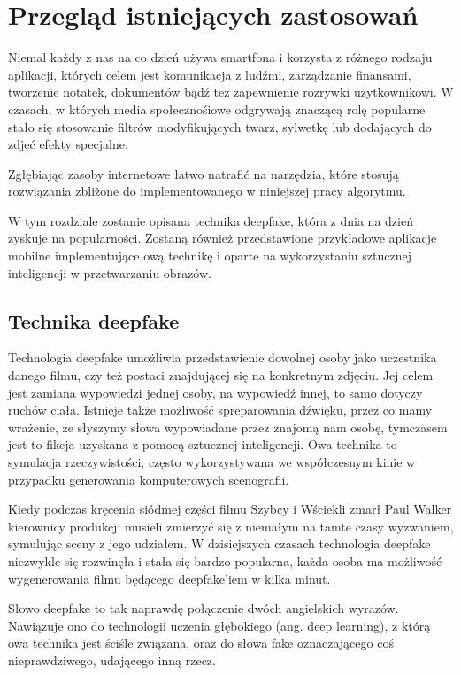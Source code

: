 \chapter{Przegląd istniejących zastosowań}

Niemal każdy z nas na co dzień używa smartfona i korzysta z różnego rodzaju aplikacji, których celem jest komunikacja z ludźmi, zarządzanie finansami, tworzenie notatek, dokumentów bądź też zapewnienie rozrywki użytkownikowi. W czasach, w których media społecznośiowe odgrywają znaczącą rolę popularne stało się stosowanie filtrów modyfikujących twarz, sylwetkę lub dodających do zdjęć efekty specjalne. 

Zgłębiając zasoby internetowe łatwo natrafić na narzędzia, które stosują rozwiązania zbliżone do implementowanego w niniejszej pracy algorytmu.

W tym rozdziale zostanie opisana technika deepfake, która z dnia na dzień zyskuje na popularności. Zostaną również przedstawione przykładowe aplikacje mobilne implementujące ową technikę i oparte na wykorzystaniu sztucznej inteligencji w przetwarzaniu obrazów. 


\section{Technika deepfake}
Technologia deepfake umożliwia przedstawienie dowolnej osoby jako uczestnika danego filmu, czy też postaci znajdującej się na konkretnym zdjęciu. Jej celem jest zamiana wypowiedzi jednej osoby, na wypowiedź innej, to samo dotyczy ruchów ciała. Istnieje także możliwość spreparowania dźwięku, przez co mamy wrażenie, że słyszymy słowa wypowiadane przez znajomą nam osobę, tymczasem jest to fikcja uzyskana z pomocą sztucznej inteligencji. Owa technika to symulacja rzeczywistości, często wykorzystywana we współczesnym kinie w przypadku generowania komputerowych scenografii.

Kiedy podczas kręcenia siódmej części filmu Szybcy i Wściekli zmarł Paul Walker kierownicy produkcji musieli zmierzyć się z niemałym na tamte czasy wyzwaniem, symulując sceny z jego udziałem. W dzisiejszych czasach technologia deepfake niezwykle się rozwinęła i stała się bardzo popularna, każda osoba ma możliwość wygenerowania filmu będącego deepfake'iem w kilka minut.

Słowo deepfake to tak naprawdę połączenie dwóch angielskich wyrazów. Nawiązuje ono do technologii uczenia głębokiego (ang. deep learning), z którą owa technika jest ściśle związana, oraz do słowa fake oznaczającego coś nieprawdziwego, udającego inną rzecz.

